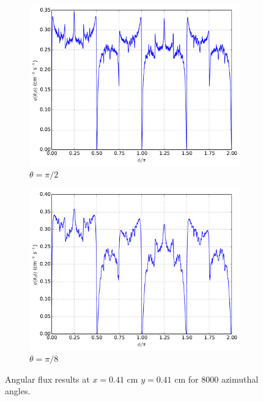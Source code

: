 \documentclass[12pt]{article}
\newenvironment{solution}[1][Solution]{\begin{trivlist}
\item[\hskip \labelsep {\bfseries #1} {\hspace{-0.2em}\bfseries:}]\hspace{0.3in}\newline}{\end{trivlist}}
\begin{document}
\begin{solution}
\begin{figure}
\begin{subfigure}{0.5\textwidth}
\includegraphics[width=1.0\textwidth]{r4141pi2.pdf}
\caption{$\theta=\pi/2$}
    \end{subfigure}
    \begin{subfigure}{0.5\textwidth}
\centering
\includegraphics[width=1.0\textwidth]{r4141pi8.pdf}
\caption{$\theta=\pi/8$}
    \end{subfigure}
    \caption{Angular flux results at $x=0.41$ cm $y=0.41$ cm for 8000 azimuthal angles.}
\end{figure}



\end{solution}
\end{document}
